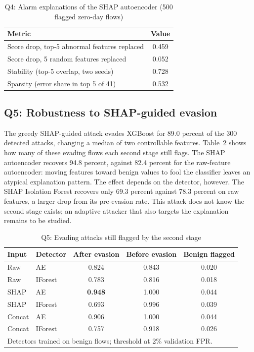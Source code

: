 \documentclass[conference]{IEEEtran}
\begin{document}
\begin{table}[t]
\caption{Q4: Alarm explanations of the SHAP autoencoder (500 flagged zero-day flows)}
\label{tab:q4}
\centering
\begin{tabular}{lc}
\toprule
Metric & Value \\
\midrule
Score drop, top-5 abnormal features replaced & 0.459 \\
Score drop, 5 random features replaced & 0.052 \\
Stability (top-5 overlap, two seeds) & 0.728 \\
Sparsity (error share in top 5 of 41) & 0.532 \\
\bottomrule
\end{tabular}
\end{table}

\subsection{Q5: Robustness to SHAP-guided evasion}
The greedy SHAP-guided attack evades XGBoost for 89.0 percent of the 300 detected attacks, changing a median of two controllable features. Table~\ref{tab:q5} shows how many of these evading flows each second stage still flags. The SHAP autoencoder recovers 94.8 percent, against 82.4 percent for the raw-feature autoencoder: moving features toward benign values to fool the classifier leaves an atypical explanation pattern. The effect depends on the detector, however. The SHAP Isolation Forest recovers only 69.3 percent against 78.3 percent on raw features, a larger drop from its pre-evasion rate. This attack does not know the second stage exists; an adaptive attacker that also targets the explanation~\cite{slack2020fooling} remains to be studied.

\begin{table}[t]
\caption{Q5: Evading attacks still flagged by the second stage}
\label{tab:q5}
\centering
\begin{tabular}{llccc}
\toprule
Input & Detector & After evasion & Before evasion & Benign flagged \\
\midrule
Raw & AE & 0.824 & 0.843 & 0.020 \\
Raw & IForest & 0.783 & 0.816 & 0.018 \\
SHAP & AE & \textbf{0.948} & 1.000 & 0.044 \\
SHAP & IForest & 0.693 & 0.996 & 0.039 \\
Concat & AE & 0.906 & 1.000 & 0.044 \\
Concat & IForest & 0.757 & 0.918 & 0.026 \\
\bottomrule
\multicolumn{5}{l}{\footnotesize Detectors trained on benign flows; threshold at 2\% validation FPR.}
\end{tabular}
\end{table}
\end{document}
